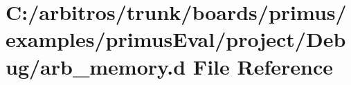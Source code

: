\hypertarget{boards_2primus_2examples_2primus_eval_2project_2_debug_2arb__memory_8d}{\section{C\-:/arbitros/trunk/boards/primus/examples/primus\-Eval/project/\-Debug/arb\-\_\-memory.d File Reference}
\label{boards_2primus_2examples_2primus_eval_2project_2_debug_2arb__memory_8d}
}
